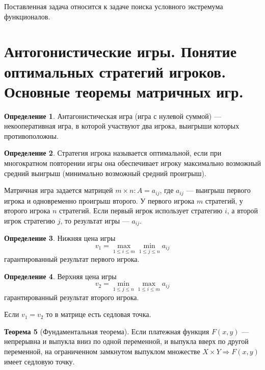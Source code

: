 \documentclass[12pt]{report}
\theoremstyle{definition}
\newtheorem{theorem}{Теорема}[chapter]
\newtheorem{definition}[theorem]{Определение}
\begin{document}
Поставленная задача относится к задаче поиска условного экстремума функционалов.


\section
{
  Антогонистические игры. Понятие оптимальных стратегий игроков.
  Основные теоремы матричных игр.
}

\begin{definition}
Антагонистическая игра (игра с нулевой суммой) --- некооперативная игра, в которой участвуют
два игрока, выигрыши которых противоположны.
\end{definition}


\begin{definition}
Стратегия игрока называется оптимальной, если при многократном повторении игры
она обеспечивает игроку максимально возможный средний выигрыш (минимально возможный
средний проигрыш).
\end{definition}

Матричная игра задается матрицей $m \times n: A = a_{ij}$, где $a_{ij}$ --- выигрыш
первого игрока и одновременно проигрыш второго. У первого игрока $m$ стратегий, у
второго игрока $n$ стратегий. Если первый игрок использует стратегию $i$, а второй
игрок стратегию $j$, то результат игры --- $a_{ij}$.

\begin{definition}
Нижняя цена игры
$$
v_1 = \max\limits_{1 \le i \le m}\min\limits_{1 \le j \le n} a_{ij}
$$
гарантированный результат первого игрока.
\end{definition}

\begin{definition}
Верхняя цена игры
$$
v_2 = \min\limits_{1 \le j \le n}\max\limits_{1 \le i \le m} a_{ij}
$$
гарантированный результат второго игрока.
\end{definition}

Если $v_1 = v_2$ то в матрице есть седловая точка.

\begin{theorem}[Фундаментальная теорема]
Если платежная функция $F(x, y)$ --- непрерывна и выпукла вниз по одной переменной,
и выпукла вверх по другой переменной, на ограниченном замкнутом выпуклом множестве
$X \times Y \Rightarrow F(x, y)$ имеет седловую точку.
\end{theorem}
\end{document}
